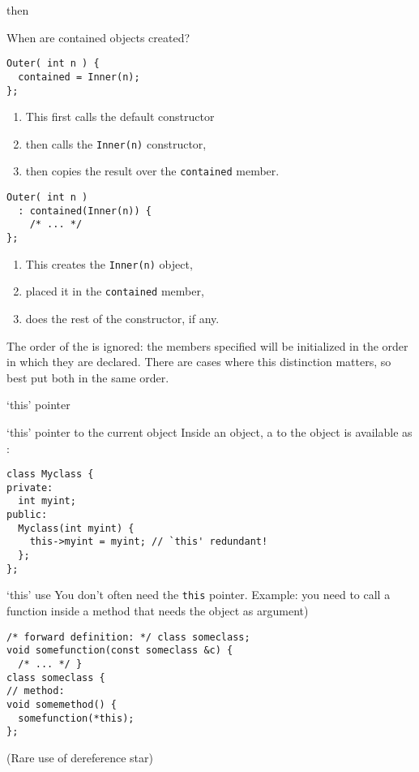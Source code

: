 then

\begin{block}{When are contained objects created?}
  \label{sl:construct-contained2}
\begin{multicols}{2}
\begin{lstlisting}
Outer( int n ) {
  contained = Inner(n);
};
\end{lstlisting}
  \begin{enumerate}
  \item This first calls the default constructor
  \item then calls the \lstinline+Inner(n)+ constructor,
  \item then copies the result over the \lstinline+contained+ member.
  \end{enumerate}
\columnbreak
\begin{lstlisting}
Outer( int n ) 
  : contained(Inner(n)) {
    /* ... */
};
\end{lstlisting}
\begin{enumerate}
\item This creates the \lstinline+Inner(n)+ object,
\item placed it in the \lstinline+contained+ member,
\item does the rest of the constructor, if any.
\end{enumerate}
\end{multicols}
\end{block}

\begin{remark}
  The order of the  is ignored: the members
  specified will be initialized in the order in which they are declared.
  There are cases where this distinction matters, so best put both in the same order.
\end{remark}

 {`this' pointer}

\begin{block}{`this' pointer to the current object}
  \label{sl:class-this}
  Inside an object, a  to the object is available
  as :
  \lstset{style=snippetcode}
\begin{lstlisting}
class Myclass {
private:
  int myint;
public:
  Myclass(int myint) {
    this->myint = myint; // `this' redundant!
  };
};
\end{lstlisting}
\end{block}

\begin{block}{`this' use}
  \label{sl:class-this-fun}
You don't often need the \lstinline{this} pointer. Example:
you need to call a function inside a method that needs the object as argument)
  \lstset{style=snippetcode}
\begin{lstlisting}
/* forward definition: */ class someclass;
void somefunction(const someclass &c) {
  /* ... */ }
class someclass {
// method:
void somemethod() {
  somefunction(*this);
};
\end{lstlisting}
(Rare use of dereference star)
\end{block}

